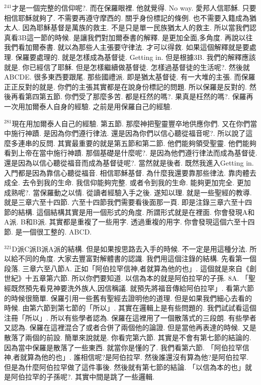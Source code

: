 \documentclass{book}
\begin{document}
$^{241}$才是一個完整的信仰呢?.
而在保羅眼裡.
他就覺得.
No way.
愛邦人信耶穌.
只要相信耶穌就夠了.
不需要再遵守摩西的.
關乎身份標記的條例.
也不需要入籍成為猶太人.
因為耶穌基督是萬族的救主.
不是只是單一民族猶太人的救主.
所以當我們認真看3B這一節的時候.
是讓我們對加爾泰書的解釋.
是更加全面,多角度.
再說以往我們看加爾泰書.
就以為那些人主張要守律法.
才可以得救.
如果這個解釋就是要處理.
保羅要處理的.
就是怎樣成為基督徒.
Getting in.
但是根據3B.
我們的解釋應該就是.
你已經信了耶穌.
但是怎樣繼續做基督徒.
怎樣過基督徒的生活呢?.
然後就ABCDE.
很多東西要跟尾.
那些國禮派.
即是猶太基督徒.
有一大堆的主張.
而保羅正正反對的就是.
你們的主張其實都是在說身份標記的問題.
所以保羅是反對的.
然後再看第四第五節.
你們受了那麼多苦.
都是枉然的嗎?.
果真是枉然的嗎?.
保羅再一次用加爾泰人自身的經驗.
之前是用保羅自己的經驗.

$^{281}$現在用加爾泰人自己的經驗.
第五節.
那麼神把聖靈豐卒地供應你們.
又在你們當中施行神蹟.
是因為你們遵行律法.
還是因為你們以信心聽從福音呢?.
所以說了這麼多連串的反問.
其實最重要的就是第五節和第二節.
他們能夠領受聖靈.
他們能夠看到上帝在當中施行神蹟.
那個基礎是什麼呢?.
是因為他們遵行律法而成為基督徒.
還是因為以信心聽從福音而成為基督徒呢?.
當然就是後者.
既然我進入Getting in.
入門都是因為靠信心聽從福音.
相信耶穌基督.
為什麼我還要靠那些律法.
靠肉體去成全.
去令到我的生命.
我信仰能夠完整.
或者令到我的生命.
能夠更加完全.
更加成熟呢?.
當保羅動之以情.
從讀者經驗入手之後.
遂知以理.
就是一些聖經的教導.
就是三章六至十四節.
六至十四節我們需要看後面那一頁.
即是注錄三章六至十四節的結構.
這個結構其實是用一個形式的角度.
所謂形式就是在裡面.
你會發現A和A派.
B和B派.
其實都是重複了一些用字.
透過重複的用字.
你會發現這個六至十四節.
是一個很工整的.
ABCD.

$^{321}$D派C派B派A派的結構.
但是如果按思路去入手的時候.
不一定是用這種分法.
所以給不同的角度.
大家去豐富對解體書的認識.
我們用這個注錄的結構.
先看第一個段落.
三章六至八節A.
正如「阿伯拉罕信神,者就算為他的也」.
這個就是來自《創世紀》十五章第六節.
所以你們要知道.
以信為本的就是阿伯拉罕的子孫.
8A.
「聖經既然預先看見神要洗外族人,因信稱議.
就預先將福音傳給阿伯拉罕」.
看第六節的時候很簡單.
保羅引用一些舊有聖經去證明他的道理.
但是如果我們細心去看的時候.
由第六節到第七節的「所以」.
其實在邏輯上是有些問題的.
我們試試看這個注冊「所以」.
所以有些學者認為.
保羅在這裡用了一個散落式的三段朗.
有些學者又認為.
保羅在這裡混合了或者合併了兩個他的論證.
但是當他再表達的時候.
又是散落了兩個的前設.
簡單來說就是.
你看完第六節.
其實是不會有第七節的結論的.
因為當中保羅是散落了一些東西.
就當你是懂的了.
我們看第六節.
「阿伯拉罕信神,者就算為他的也」.
誰相信呢?是阿伯拉罕.
然後誰還沒有算為他?是阿伯拉罕.
但是為什麼阿伯拉罕做了這件事後.
然後就有第七節的結論.
「以信為本的也」就是阿伯拉罕的子孫呢?.
其實中間是跳了一些邏輯.
\end{document}

